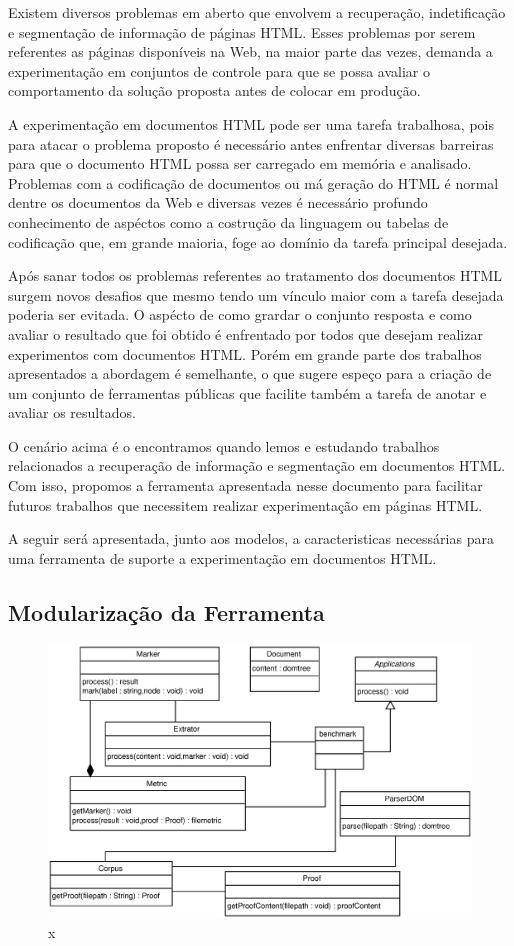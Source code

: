 \documentclass[12pt, a4paper]{article}
\begin{document}
Existem diversos problemas em aberto que envolvem a
recuperação, indetificação e segmentação de 
informação de páginas HTML. Esses problemas por serem referentes as
páginas disponíveis na Web, na maior parte das vezes, demanda a
experimentação em conjuntos de controle para que se possa avaliar o
comportamento da solução proposta antes de colocar em produção.

A experimentação em documentos HTML pode ser uma tarefa trabalhosa, pois
para atacar o problema proposto é necessário antes enfrentar diversas
barreiras para que o documento HTML possa ser carregado em memória e
analisado. Problemas com a codificação de documentos ou má geração do
HTML é normal dentre os documentos da Web e diversas vezes é necessário
profundo conhecimento de aspéctos como a costrução da linguagem ou
tabelas de codificação que, em grande maioria, foge ao domínio da tarefa
principal desejada.

Após sanar todos os problemas referentes ao tratamento dos documentos
HTML surgem novos desafios que mesmo tendo um vínculo maior com a tarefa
desejada poderia ser evitada. O aspécto de como grardar o conjunto
resposta e como avaliar o resultado que foi obtido é enfrentado por
todos que desejam realizar experimentos com documentos HTML. Porém em
grande parte dos trabalhos apresentados a abordagem é semelhante, o que
sugere espeço para a criação de um conjunto de ferramentas públicas que
facilite também a tarefa de anotar e avaliar os resultados.

O cenário acima é o encontramos quando lemos e estudando trabalhos
relacionados a recuperação de informação e segmentação em documentos
HTML. Com isso, propomos a ferramenta apresentada nesse documento para
facilitar futuros trabalhos que necessitem realizar experimentação em páginas
HTML.

A seguir será apresentada, junto aos modelos, a caracteristicas
necessárias para uma ferramenta de suporte a experimentação em
documentos HTML.

  \subsection{Modularização da Ferramenta}

\begin{figure}[htb]
  \begin{center}
  \includegraphics[width=12cm]{img/classes.eps}
  \caption{x}
  \label{x}
  \end{center}
\end{figure}
\end{document}

